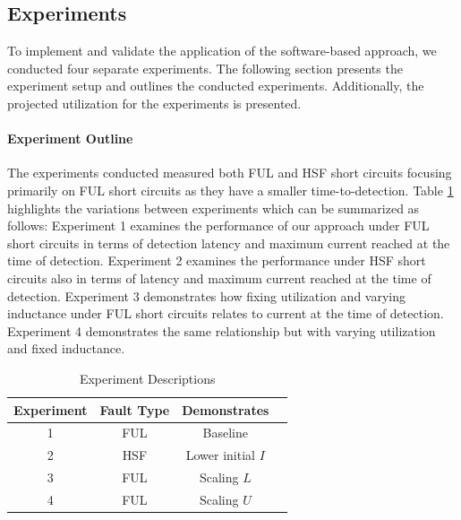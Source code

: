 \clearpage \subsection{Experiments}\label{subsec:experiments}
To implement and validate the application of the software-based approach, we conducted four separate experiments.
The following section presents the experiment setup and outlines the conducted experiments.
Additionally, the projected utilization for the experiments is presented.

\paragraph{Experiment Outline}
The experiments conducted measured both FUL and HSF short circuits focusing primarily on FUL short circuits as they have a smaller time-to-detection.
Table \ref{tab:ExperimentDescriptions} highlights the variations between experiments which can be summarized as follows:
Experiment 1 examines the performance of our approach under FUL short circuits in terms of detection latency and maximum current reached at the time of detection.
Experiment 2 examines the performance under HSF short circuits also in terms of latency and maximum current reached at the time of detection.
Experiment 3 demonstrates how fixing utilization and varying inductance under FUL short circuits relates to current at the time of detection.
Experiment 4 demonstrates the same relationship but with varying utilization and fixed inductance.
\begin{table}[!h]
    \centering	
    \bgroup
    \def\arraystretch{1.00}%
    \begin{tabular}{| c | c | c | c |}
            \hline			
            Experiment & Fault Type & Demonstrates\\ \hline \hline \cline{1-3}
            1 & FUL & Baseline\\ \hline
            2 & HSF & Lower initial $I$\\ \hline
            3 & FUL & Scaling $L$\\ \hline
            4 & FUL & Scaling $U$\\ \hline  
    \end{tabular}
    \egroup
    \caption{Experiment Descriptions}
    \label{tab:ExperimentDescriptions}
\end{table}

